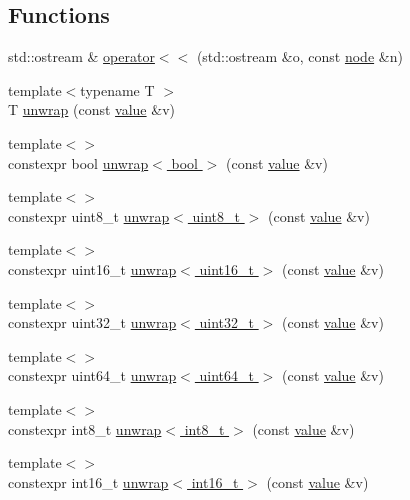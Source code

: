\subsection*{Functions}
\begin{DoxyCompactItemize}
\item 
std\+::ostream \& \hyperlink{namespacetelegraph_a628bfaad5d5f57930fae7a3fddab685c}{operator$<$$<$} (std\+::ostream \&o, const \hyperlink{classtelegraph_1_1node}{node} \&n)
\item 
{\footnotesize template$<$typename T $>$ }\\T \hyperlink{namespacetelegraph_ae06614be6a21deb7e0112a24d559f72c}{unwrap} (const \hyperlink{classtelegraph_1_1value}{value} \&v)
\item 
{\footnotesize template$<$$>$ }\\constexpr bool \hyperlink{namespacetelegraph_adadeb5e799920fdae525572176480217}{unwrap$<$ bool $>$} (const \hyperlink{classtelegraph_1_1value}{value} \&v)
\item 
{\footnotesize template$<$$>$ }\\constexpr uint8\+\_\+t \hyperlink{namespacetelegraph_a0f793729f8f7cc64a2b04d9413086a61}{unwrap$<$ uint8\+\_\+t $>$} (const \hyperlink{classtelegraph_1_1value}{value} \&v)
\item 
{\footnotesize template$<$$>$ }\\constexpr uint16\+\_\+t \hyperlink{namespacetelegraph_a77747fdae77bfc0a6f28feac16124207}{unwrap$<$ uint16\+\_\+t $>$} (const \hyperlink{classtelegraph_1_1value}{value} \&v)
\item 
{\footnotesize template$<$$>$ }\\constexpr uint32\+\_\+t \hyperlink{namespacetelegraph_a9ec68c41802ea314d044e8008d883e23}{unwrap$<$ uint32\+\_\+t $>$} (const \hyperlink{classtelegraph_1_1value}{value} \&v)
\item 
{\footnotesize template$<$$>$ }\\constexpr uint64\+\_\+t \hyperlink{namespacetelegraph_a3b0b76cf537c5924267bdc603cf5c95e}{unwrap$<$ uint64\+\_\+t $>$} (const \hyperlink{classtelegraph_1_1value}{value} \&v)
\item 
{\footnotesize template$<$$>$ }\\constexpr int8\+\_\+t \hyperlink{namespacetelegraph_a2118536f845ce42328f8e831d001d1c3}{unwrap$<$ int8\+\_\+t $>$} (const \hyperlink{classtelegraph_1_1value}{value} \&v)
\item 
{\footnotesize template$<$$>$ }\\constexpr int16\+\_\+t \hyperlink{namespacetelegraph_a6050960b7d95cc75c861451cac291222}{unwrap$<$ int16\+\_\+t $>$} (const \hyperlink{classtelegraph_1_1value}{value} \&v)

\end{DoxyCompactItemize}

